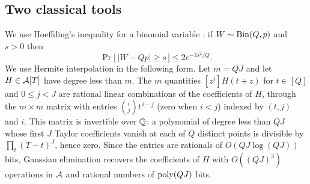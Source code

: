 \subsection{Two classical tools}
We use Hoeffding's inequality for a binomial variable \cite{Hoe63}: if
$W\sim\operatorname{Bin}(Q,p)$ and $s>0$ then
\begin{equation}\label{eq:hoeffding}
  \Pr\bigl[\,|W-Qp|\ge s\,\bigr]\le 2e^{-2s^2/Q}.
\end{equation}
We use Hermite interpolation in the following form. Let $m=QJ$ and let
$H\in\mathcal{A}[T]$ have degree less than $m$. The $m$ quantities
$[z^j]H(t+z)$ for $t\in[Q]$ and $0\le j<J$ are rational linear combinations of
the coefficients of $H$, through the $m\times m$ matrix with entries
$\binom{i}{j}t^{\,i-j}$ (zero when $i<j$) indexed by $(t,j)$ and $i$. This matrix
is invertible over $\mathbb{Q}$: a polynomial of degree less than $QJ$ whose first $J$
Taylor coefficients vanish at each of $Q$ distinct points is divisible by
$\prod_t(T-t)^J$, hence zero. Since the entries are rationals of
$O(QJ\log(QJ))$ bits, Gaussian elimination recovers the coefficients of $H$ with
$O((QJ)^3)$ operations in $\mathcal{A}$ and rational numbers of $\operatorname{poly}(QJ)$ bits.
